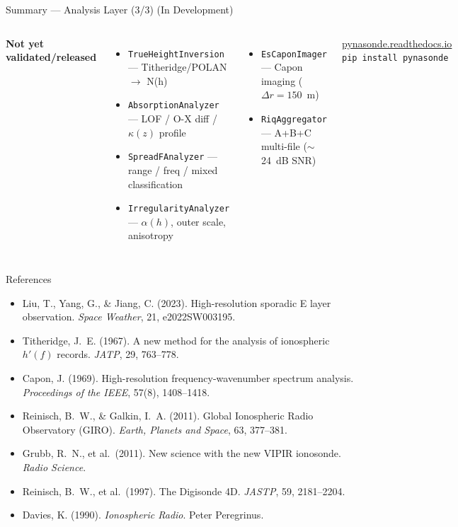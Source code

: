 \documentclass[aspectratio=169,11pt]{beamer}
\begin{document}
\begin{frame}{Summary — Analysis Layer (3/3) \textcolor{orange!80!black}{(In Development)}}
  \begin{columns}
    \textbf{Not yet validated/released}
    \begin{itemize}\small
      \item \texttt{TrueHeightInversion} — Titheridge/POLAN $\to$ N(h)
      \item \texttt{AbsorptionAnalyzer} — LOF / O-X diff / $\kappa(z)$ profile
      \item \texttt{SpreadFAnalyzer} — range / freq / mixed classification
      \item \texttt{IrregularityAnalyzer} — $\alpha(h)$, outer scale, anisotropy
    \end{itemize}
    \vspace{0.15cm}
    \begin{itemize}\small
      \item \texttt{EsCaponImager} — Capon imaging ($\Delta r = 150$~m)
      \item \texttt{RiqAggregator} — A+B+C multi-file ($\sim$24~dB SNR)
    \end{itemize}
    \vspace{0.3cm}
    \begin{block}{}
      \small
      \href{https://pynasonde.readthedocs.io}{pynasonde.readthedocs.io}\\
      \texttt{pip install pynasonde}
    \end{block}
  \end{columns}
\end{frame}

\begin{frame}[allowframebreaks]{References}
  \footnotesize
  \begin{itemize}
    \item Liu, T., Yang, G., \& Jiang, C. (2023). High-resolution sporadic E layer
          observation. \textit{Space Weather}, 21, e2022SW003195.
    \item Titheridge, J.\ E. (1967). A new method for the analysis of ionospheric
          $h'(f)$ records. \textit{JATP}, 29, 763--778.
    \item Capon, J. (1969). High-resolution frequency-wavenumber spectrum analysis.
          \textit{Proceedings of the IEEE}, 57(8), 1408--1418.
    \item Reinisch, B.\ W., \& Galkin, I.\ A. (2011). Global Ionospheric Radio
          Observatory (GIRO). \textit{Earth, Planets and Space}, 63, 377--381.
    \item Grubb, R.\ N., et al.\ (2011). New science with the new VIPIR ionosonde.
          \textit{Radio Science}.
    \item Reinisch, B.\ W., et al.\ (1997). The Digisonde 4D. \textit{JASTP}, 59, 2181--2204.
    \item Davies, K. (1990). \textit{Ionospheric Radio}. Peter Peregrinus.
  \end{itemize}
\end{frame}
\end{document}
